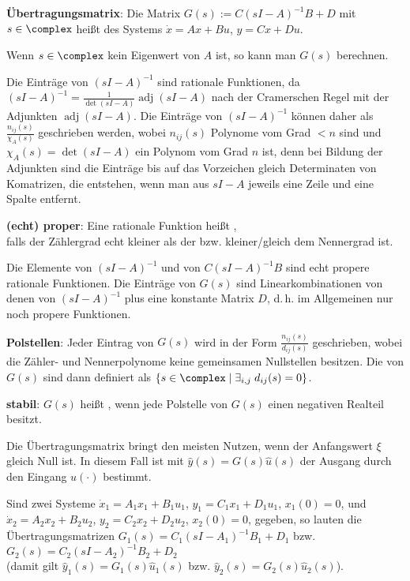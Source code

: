 \linie

\textbf{Übertragungsmatrix}:
Die Matrix $G(s) := C(sI - A)^{-1} B + D$ mit $s \in \complex$ heißt
 des Systems $\dot{x} = Ax + Bu$, $y = Cx + Du$.

Wenn $s \in \complex$ kein Eigenwert von $A$ ist, so kann man $G(s)$ berechnen.

Die Einträge von $(sI - A)^{-1}$ sind rationale Funktionen, da
$(sI - A)^{-1} = \frac{1}{\det(sI - A)} \operatorname{adj}(sI - A)$
nach der Cramerschen Regel mit der Adjunkten $\operatorname{adj}(sI - A)$.
Die Einträge von $(sI - A)^{-1}$ können daher als $\frac{n_{ij}(s)}{\chi_A(s)}$ geschrieben werden,
wobei $n_{ij}(s)$ Polynome vom Grad $< n$ sind und $\chi_A(s) = \det(sI - A)$
ein Polynom vom Grad $n$ ist,
denn bei Bildung der Adjunkten sind die Einträge bis auf das Vorzeichen gleich
Determinaten von Komatrizen, die entstehen, wenn man aus $sI - A$ jeweils eine Zeile und
eine Spalte entfernt.

\textbf{(echt) proper}:
Eine rationale Funktion heißt ,\\
falls der Zählergrad echt kleiner als der bzw. kleiner/gleich dem Nennergrad ist.

Die Elemente von $(sI - A)^{-1}$ und von $C(sI - A)^{-1} B$ sind echt propere rationale Funktionen.
Die Einträge von $G(s)$ sind Linearkombinationen von denen von $(sI - A)^{-1}$ plus eine
konstante Matrix $D$, d.\,h. im Allgemeinen nur noch propere Funktionen.

\textbf{Polstellen}:
Jeder Eintrag von $G(s)$ wird in der Form $\frac{n_{ij}(s)}{d_{ij}(s)}$ geschrieben,
wobei die Zähler- und Nennerpolynome keine gemeinsamen Nullstellen besitzen.
Die  von $G(s)$ sind dann definiert als $\{s \in \complex \;|\;
\exists_{i, j}\; d_{ij}(s) = 0\}$.

\textbf{stabil}:
$G(s)$ heißt , wenn jede Polstelle von $G(s)$ einen negativen Realteil besitzt.

\linie
\pagebreak

Die Übertragungsmatrix bringt den meisten Nutzen, wenn der Anfangswert $\xi$ gleich Null ist.
In diesem Fall ist mit $\widehat{y}(s) = G(s) \widehat{u}(s)$ der Ausgang durch den Eingang
$u(\cdot)$ bestimmt.

Sind zwei Systeme $\dot{x}_1 = A_1 x_1 + B_1 u_1$, $y_1 = C_1 x_1 + D_1 u_1$, $x_1(0) = 0$,
und\\
$\dot{x}_2 = A_2 x_2 + B_2 u_2$, $y_2 = C_2 x_2 + D_2 u_2$, $x_2(0) = 0$,
gegeben, so lauten die Übertragungsmatrizen $G_1(s) = C_1 (sI - A_1)^{-1} B_1 + D_1$ bzw.
$G_2(s) = C_2 (sI - A_2)^{-1} B_2 + D_2$\\
(damit gilt $\widehat{y}_1(s) = G_1(s) \widehat{u}_1(s)$ bzw.
$\widehat{y}_2(s) = G_2(s) \widehat{u}_2(s)$).

